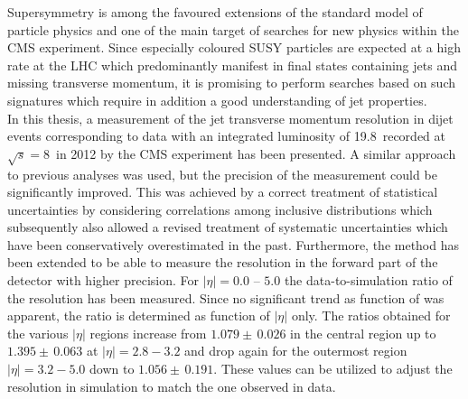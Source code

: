 Supersymmetry is among the favoured extensions of the standard model of particle physics and one of the main target of searches for new physics within the CMS experiment. Since especially coloured SUSY particles are expected at a high rate at the LHC which predominantly manifest in final states containing jets and missing transverse momentum, it is promising to perform searches based on such signatures which require in addition a good understanding of jet properties. \\
In this thesis, a measurement of the jet transverse momentum resolution in dijet events corresponding to data with an integrated luminosity of 19.8~\fbinv recorded at $\sqrt{s}=8$~\tev in 2012 by the CMS experiment has been presented. A similar approach to previous analyses was used, but the precision of the measurement could be significantly improved. This was achieved by a correct treatment of statistical uncertainties by considering correlations among inclusive distributions which subsequently also allowed a revised treatment of systematic uncertainties which have been conservatively overestimated in the past. Furthermore, the method has been extended to be able to measure the resolution in the forward part of the detector with higher precision. For $|\eta| = 0.0$ -- $5.0$ the data-to-simulation ratio of the resolution has been measured. Since no significant trend as function of \ptave was apparent, the ratio is determined as function of $|\eta|$ only. The ratios obtained for the various $|\eta|$ regions increase from $1.079\pm \, 0.026$ in the central region up to $1.395\pm \, 0.063$ at $|\eta| = 2.8 - 3.2$ and drop again for the outermost region $|\eta| = 3.2 - 5.0$ down to $1.056\pm \, 0.191$. These values can be utilized to adjust the resolution in simulation to match the one observed in data.\\
